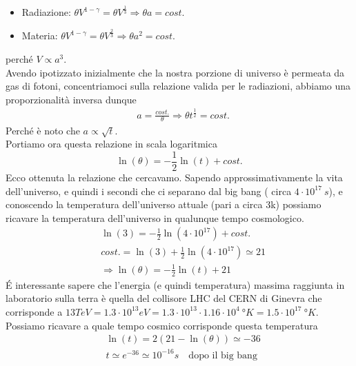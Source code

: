 \documentclass[
10pt, %
a4paper, %
oneside, %
headinclude,footinclude, %
BCOR5mm, %
]{scrartcl}
\begin{document}
\begin{itemize}
	\item Radiazione: \(\theta V^{1-\gamma} = \theta V^{\frac{1}{3}} \Rightarrow \theta a = cost.\)
	\item Materia: \(\theta V^{1-\gamma} = \theta V^{\frac{2}{3}} \Rightarrow \theta a^2 = cost.\)
\end{itemize}
perché $V \propto a^3$.\\
Avendo ipotizzato inizialmente  che la nostra porzione di universo è permeata da gas di fotoni, concentriamoci sulla relazione valida per le radiazioni, abbiamo una proporzionalità inversa dunque
\begin{align*}
	&a = \frac{cost.}{\theta} \Rightarrow  \theta t^{\frac{1}{2}} = cost.
\end{align*}
Perché è noto che \(a\propto \sqrt{t}\).\\
Portiamo ora questa relazione in scala logaritmica
\[\ln(\theta) = -\frac{1}{2}\ln(t) + cost.\]
Ecco ottenuta la relazione che cercavamo. Sapendo approssimativamente la vita dell'universo, e quindi i secondi che ci separano dal big bang ( circa $4\cdot 10^{17}\ s$), e conoscendo la temperatura dell'universo attuale (pari a circa 3\textdegree k) possiamo ricavare la temperatura dell'universo in qualunque tempo cosmologico. 
\begin{align*}
	&\ln(3) = -\frac{1}{2}\ln(4\cdot10^{17}) + cost.\\
	& cost. = \ln(3) + \frac{1}{2}\ln(4\cdot10^{17}) \simeq 21\\
	&\Rightarrow \ln(\theta) = -\frac{1}{2}\ln(t) + 21 
\end{align*}
\'{E} interessante sapere che l'energia (e quindi temperatura) massima raggiunta in laboratorio sulla terra è quella del collisore LHC del CERN di Ginevra che corrisponde a $13 TeV = 1.3 \cdot 10^{13} eV = 1.3 \cdot 10^{13} \cdot 1.16 \cdot 10^4\ °K = 1.5\cdot 10^{17}\ °K $. Possiamo ricavare a quale tempo cosmico corrisponde questa temperatura
\begin{align*}
	& \ln(t) = 2(21 -\ln(\theta)) \simeq -36 \\
	& t \simeq e^{-36} \simeq 10^{-16}s\quad \text{dopo il big bang}
\end{align*}
\end{document}
